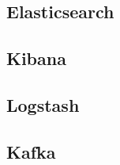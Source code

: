 \subsection{Elasticsearch}

\newpage{}
\subsection{Kibana}

\newpage{}
\subsection{Logstash}

\newpage{}
\subsection{Kafka}

